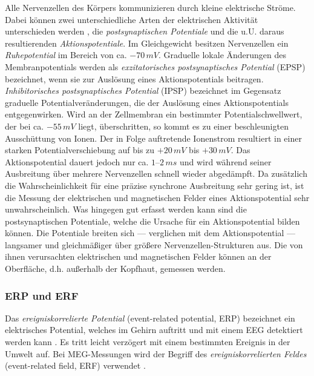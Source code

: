 \documentclass[doc,a4paper,12pt]{apa6}
\begin{document}
Alle Nervenzellen des Körpers kommunizieren durch kleine elektrische Ströme. Dabei können zwei unterschiedliche Arten der elektrischen Aktivität unterschieden werden \parencite{da1998biophysical}, die \emph{postsynaptischen Potentiale} und die u.U. daraus resultierenden \emph{Aktionspotentiale}. Im Gleichgewicht besitzen Nervenzellen ein \emph{Ruhepotential} im Bereich von ca. $-70\,mV$. Graduelle lokale Änderungen des Membranpotentials werden als \emph{exzitatorisches postsynaptisches Potential} (EPSP) bezeichnet, wenn sie zur Auslösung eines Aktionspotentials beitragen. \emph{Inhibitorisches postsynaptisches Potential} (IPSP) bezeichnet im Gegensatz graduelle Potentialveränderungen, die der Auslösung eines Aktionspotentials entgegenwirken. Wird an der Zellmembran ein bestimmter Potentialschwellwert, der bei ca. $-55\,mV$ liegt, überschritten, so kommt es zu einer beschleunigten Ausschüttung von Ionen. Der in Folge auftretende Ionenstrom resultiert in einer starken Potentialverschiebung auf bis zu $+20\,mV$ bis $+30\,mV$. Das Aktionspotential dauert jedoch nur ca. $1$--$2\,ms$ und wird während seiner Ausbreitung über mehrere Nervenzellen schnell wieder abgedämpft. Da zusätzlich die Wahrscheinlichkeit für eine präzise synchrone Ausbreitung sehr gering ist, ist die Messung der elektrischen und magnetischen Felder eines Aktionspotential sehr unwahrscheinlich. Was hingegen gut erfasst werden kann sind die postsynaptischen Potentiale, welche die Ursache für ein Aktionspotential bilden können. Die Potentiale breiten sich --- verglichen mit dem Aktionspotential --- langsamer und gleichmäßiger über größere Nervenzellen-Strukturen aus. Die von ihnen verursachten elektrischen und magnetischen Felder können an der Oberfläche, d.h. außerhalb der Kopfhaut, gemessen werden.

\subsubsection{ERP und ERF}
\label{sec:erf}

Das \emph{ereigniskorrelierte Potential} (event-related potential, ERP) bezeichnet ein elektrisches Potential, welches im Gehirn auftritt und mit einem EEG detektiert werden kann \parencite{luck2014introduction}. Es tritt leicht verzögert mit einem bestimmten Ereignis in der Umwelt auf. Bei MEG-Messungen wird der Begriff des \emph{ereigniskorrelierten Feldes} (event-related field, ERF) verwendet \parencite{brown1999neurocognition}.
\end{document}
